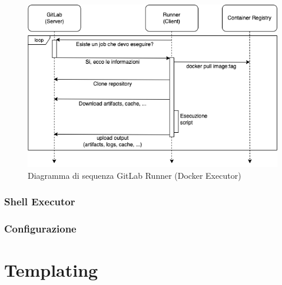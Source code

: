 \begin{figure}[H]
\centering
\includegraphics[width=1\textwidth]{img/tesi-17-runner.drawio.png}
\caption{Diagramma di sequenza GitLab Runner (Docker Executor)}
\end{figure}

\subsubsection{Shell Executor}

\subsubsection{Configurazione}

\section{Templating}
